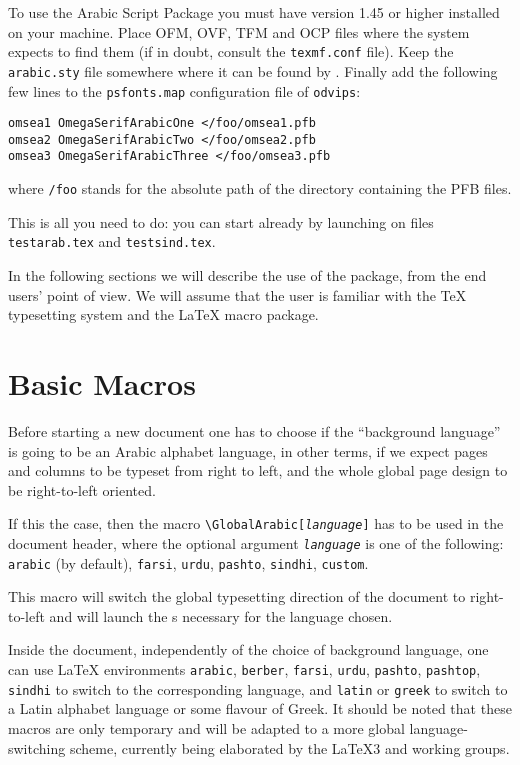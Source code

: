 \documentclass[a4paper,11pt]{article}
\begin{document}
To use the \OMEGA{} Arabic Script Package you must have \OMEGA{}
version 1.45 or higher installed on your machine. Place OFM, OVF, TFM
and OCP files where the system expects to find them (if in doubt,
consult the \texttt{texmf.conf} file). Keep the \texttt{arabic.sty}
file somewhere where it can be found by \OMEGA{}. Finally add the
following few lines to the \texttt{psfonts.map} configuration file of
\texttt{odvips}:
\begin{verbatim}
omsea1 OmegaSerifArabicOne </foo/omsea1.pfb
omsea2 OmegaSerifArabicTwo </foo/omsea2.pfb
omsea3 OmegaSerifArabicThree </foo/omsea3.pfb
\end{verbatim}
where \texttt{/foo} stands for the absolute path of the directory
containing the PFB files.

This is all you need to do: you can start already by launching
\OMEGA{} on files \texttt{testarab.tex} and \texttt{testsind.tex}.

In the following sections we will describe the use of the package,
from the end users' point of view.  We will assume that the user is
familiar with the \TeX{} typesetting system and the \LaTeX{} macro
package.

\section{Basic Macros}

Before starting a new document one has to choose if the ``background
language'' is going to be an Arabic alphabet language, in other terms,
if we expect pages and columns to be typeset from right to left, and
the whole global page design to be right-to-left oriented.

If this the case, then the macro
\verb=\GlobalArabic[=\texttt{\textit{language}}\verb=]= has to be used
in the document header, where the optional argument
\texttt{\textit{language}} is one of the following: \texttt{arabic}
(by default), \texttt{farsi}, \texttt{urdu}, \texttt{pashto},
\texttt{sindhi}, \texttt{custom}.

This macro will switch the global typesetting direction of the
document to right-to-left and will launch the \OTP s necessary for the
language chosen.

Inside the document, independently of the choice of background
language, one can use \LaTeX{} environments \texttt{arabic},
\texttt{berber}, \texttt{farsi}, \texttt{urdu}, \texttt{pashto},
\texttt{pashtop}, \texttt{sindhi} to switch to the corresponding
language, and \texttt{latin} or \texttt{greek} to switch to a Latin
alphabet language or some flavour of Greek. It should be noted that
these macros are only temporary and will be adapted to a more global
language-switching scheme, currently being elaborated by the \LaTeX3
and \OMEGA{} working groups.
\end{document}
